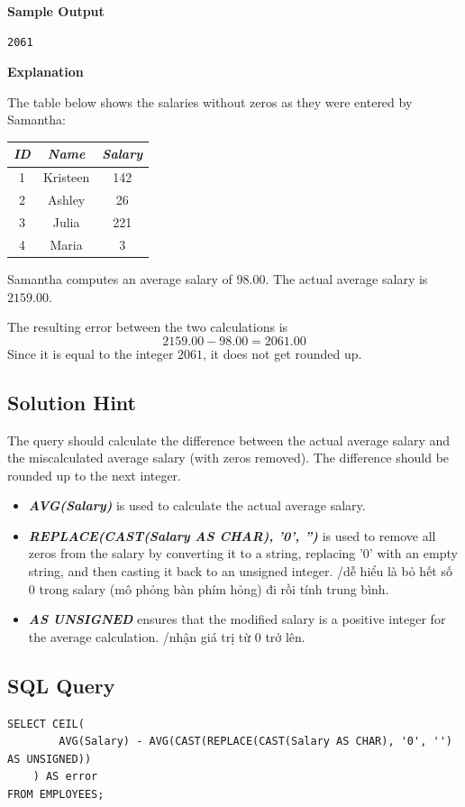 \documentclass[12pt,a4paper]{article}
\renewcommand{\arraystretch}{1.5} %
\begin{document}
\textbf{Sample Output}
\begin{verbatim}
2061
\end{verbatim}

\textbf{Explanation}

The table below shows the salaries without zeros as they were entered by Samantha:

\begin{table}[H]
\centering
\renewcommand{\arraystretch}{1.3}
\begin{tabular}{|c|c|c|}
\hline
\textit{ID} & \textit{Name} & \textit{Salary} \\ \hline
1 & Kristeen & 142 \\ \hline
2 & Ashley   & 26  \\ \hline
3 & Julia    & 221 \\ \hline
4 & Maria    & 3   \\ \hline
\end{tabular}
\end{table}

Samantha computes an average salary of \(98.00\).  
The actual average salary is \(2159.00\).

The resulting error between the two calculations is
\[
2159.00 - 98.00 = 2061.00
\]
Since it is equal to the integer \(2061\), it does not get rounded up.
\subsection*{Solution Hint}
The query should calculate the difference between the actual average salary and the miscalculated average salary (with zeros removed). The difference should be rounded up to the next integer.
\begin{itemize}
    \item \textit{\textbf{AVG(Salary)}} is used to calculate the actual average salary.
    \item \textit{\textbf{REPLACE(CAST(Salary AS CHAR), '0', '')}} is used to remove all zeros from the salary by converting it to a string, replacing '0' with an empty string, and then casting it back to an unsigned integer.
    /dễ hiểu là bỏ hết số 0 trong salary (mô phỏng bàn phím hỏng) đi rồi tính trung bình.
    \item \textit{\textbf{AS UNSIGNED}} ensures that the modified salary is a positive integer for the average calculation. /nhận giá trị từ 0 trở lên.
\end{itemize}
\subsection*{SQL Query}
\begin{lstlisting}[style=sqlstyle]
SELECT CEIL(
        AVG(Salary) - AVG(CAST(REPLACE(CAST(Salary AS CHAR), '0', '') AS UNSIGNED))
    ) AS error
FROM EMPLOYEES;
\end{lstlisting}
\end{document}

